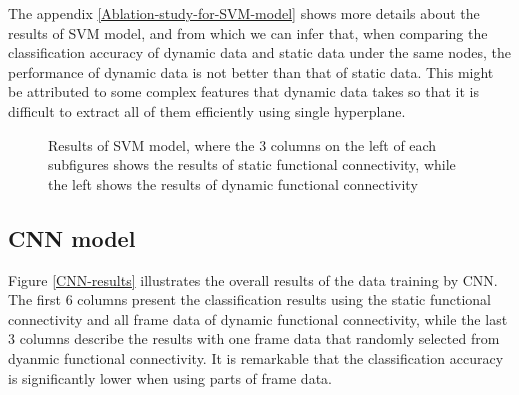 \documentclass[11pt]{article}
\begin{document}
The appendix \ref{Ablation-study-for-SVM-model} shows more details about the results of SVM model, and from which we can infer that, when comparing the classification accuracy of dynamic data and static data under the same nodes, the performance of dynamic data is not better than that of static data. This might be attributed to some complex features that dynamic data takes so that it is difficult to extract all of them efficiently using single hyperplane.

\begin{figure}[H]
    \centering
    \caption{Results of SVM model, where the 3 columns on the left of each subfigures shows the results of static functional connectivity, while the left shows the results of dynamic functional connectivity}
    \label{svm-results}
\end{figure}

\subsection{CNN model}

Figure \ref{CNN-results} illustrates the overall results of the data training by CNN. The first 6 columns present the classification results using the static functional connectivity and all frame data of dynamic functional connectivity, while the last 3 columns describe the results with one frame data that randomly selected from dyanmic functional connectivity. It is remarkable that the classification accuracy is significantly lower when using parts of frame data.
\end{document}
